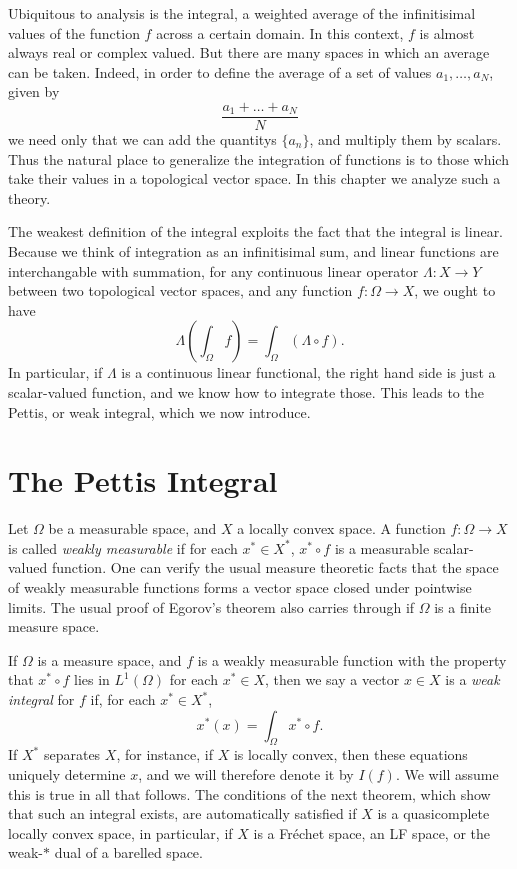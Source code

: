 Ubiquitous to analysis is the integral, a weighted average of the infinitisimal values of the function $f$ across a certain domain. In this context, $f$ is almost always real or complex valued. But there are many spaces in which an average can be taken. Indeed, in order to define the average of a set of values $a_1, \dots, a_N$, given by
%
\[ \frac{a_1 + \dots + a_N}{N} \]
%
we need only that we can add the quantitys $\{ a_n \}$, and multiply them by scalars. Thus the natural place to generalize the integration of functions is to those which take their values in a topological vector space. In this chapter we analyze such a theory.

The weakest definition of the integral exploits the fact that the integral is linear. Because we think of integration as an infinitisimal sum, and linear functions are interchangable with summation, for any continuous linear operator $\Lambda: X \to Y$ between two topological vector spaces, and any function $f: \Omega \to X$, we ought to have
%
\[ \Lambda \left( \int_\Omega f \right) = \int_\Omega (\Lambda \circ f). \]
%
In particular, if $\Lambda$ is a continuous linear functional, the right hand side is just a scalar-valued function, and we know how to integrate those. This leads to the Pettis, or weak integral, which we now introduce.

\section{The Pettis Integral}

Let $\Omega$ be a measurable space, and $X$ a locally convex space. A function $f: \Omega \to X$ is called \emph{weakly measurable} if for each $x^* \in X^*$, $x^* \circ f$ is a measurable scalar-valued function. One can verify the usual measure theoretic facts that the space of weakly measurable functions forms a vector space closed under pointwise limits. The usual proof of Egorov's theorem also carries through if $\Omega$ is a finite measure space.

If $\Omega$ is a measure space, and $f$ is a weakly measurable function with the property that $x^* \circ f$ lies in $L^1(\Omega)$ for each $x^* \in X$, then we say a vector $x \in X$ is a \emph{weak integral} for $f$ if, for each $x^* \in X^*$,
%
\[ x^*(x) = \int_\Omega x^* \circ f. \]
%
If $X^*$ separates $X$, for instance, if $X$ is locally convex, then these equations uniquely determine $x$, and we will therefore denote it by $I(f)$. We will assume this is true in all that follows. The conditions of the next theorem, which show that such an integral exists, are automatically satisfied if $X$ is a quasicomplete locally convex space, in particular, if $X$ is a Fr\'{e}chet space, an LF space, or the weak-$*$ dual of a barelled space.

